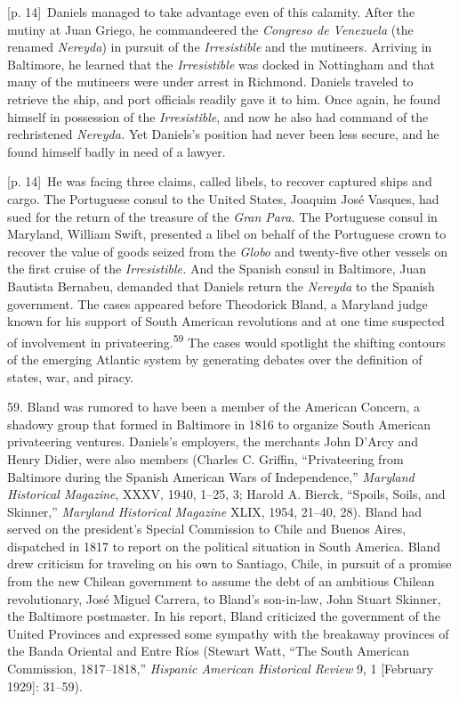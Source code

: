 \documentclass[10pt,a4paper]{article}
\begin{document}
{\scriptsize\color{gray} [p. 14]}\ Daniels managed to take advantage even of this calamity. After the mutiny at Juan Griego, he commandeered the \textit{Congreso de Venezuela} (the renamed \textit{Nereyda}) in pursuit of the \textit{Irresistible} and the mutineers. Arriving in Baltimore, he learned that the \textit{Irresistible} was docked in Nottingham and that many of the mutineers were under arrest in Richmond. Daniels traveled to retrieve the ship, and port officials readily gave it to him. Once again, he found himself in possession of the \textit{Irresistible}, and now he also had command of the rechristened \textit{Nereyda.} Yet Daniels’s position had never been less secure, and he found himself badly in need of a lawyer.\par
{\scriptsize\color{gray} [p. 14]}\ He was facing three claims, called libels, to recover captured ships and cargo. The Portuguese consul to the United States, Joaquim José Vasques, had sued for the return of the treasure of the \textit{Gran Para.} The Portuguese consul in Maryland, William Swift, presented a libel on behalf of the Portuguese crown to recover the value of goods seized from the \textit{Globo} and twenty-five other vessels on the first cruise of the \textit{Irresistible.} And the Spanish consul in Baltimore, Juan Bautista Bernabeu, demanded that Daniels return the \textit{Nereyda} to the Spanish government. The cases appeared before Theodorick Bland, a Maryland judge known for his support of South American revolutions and at one time suspected of involvement in privateering.\nobreak\textsuperscript{59} The cases would spotlight the shifting contours of the emerging Atlantic system by generating debates over the definition of states, war, and piracy.\par{\small 59. Bland was rumored to have been a member of the American Concern, a shadowy group that formed in Baltimore in 1816 to organize South American privateering ventures. Daniels’s employers, the merchants John D’Arcy and Henry Didier, were also members (Charles C. Griffin, “Privateering from Baltimore during the Spanish American Wars of Independence,” \textit{Maryland Historical Magazine}, XXXV, 1940, 1–25, 3; Harold A. Bierck, “Spoils, Soils, and Skinner,” \textit{Maryland Historical Magazine} XLIX, 1954, 21–40, 28). Bland had served on the president’s Special Commission to Chile and Buenos Aires, dispatched in 1817 to report on the political situation in South America. Bland drew criticism for traveling on his own to Santiago, Chile, in pursuit of a promise from the new Chilean government to assume the debt of an ambitious Chilean revolutionary, José Miguel Carrera, to Bland’s son-in-law, John Stuart Skinner, the Baltimore postmaster. In his report, Bland criticized the government of the United Provinces and expressed some sympathy with the breakaway provinces of the Banda Oriental and Entre Ríos (Stewart Watt, “The South American Commission, 1817–1818,” \textit{Hispanic American Historical Review} 9, 1 [February 1929]: 31–59).\par}
\end{document}
